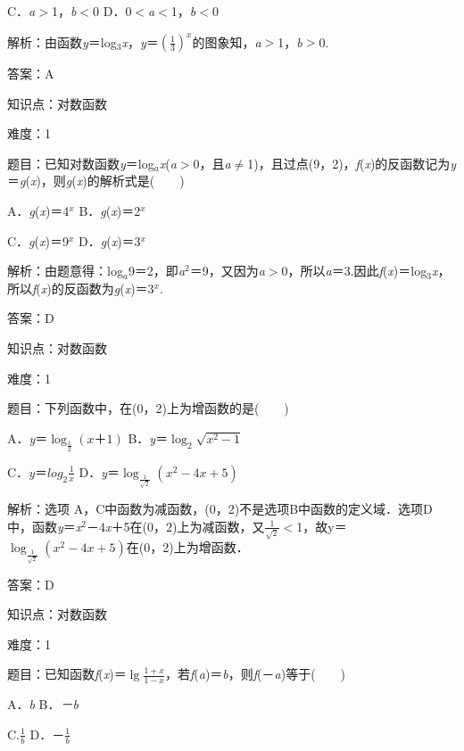 \documentclass{article} %
\begin{document}
C．\textit{a}$\mathrm{>}$1，\textit{b}$\mathrm{<}$0   D．0$\mathrm{<}$\textit{a}$\mathrm{<}$1，\textit{b}$\mathrm{<}$0

解析：由函数\textit{y}＝log${}_{3}$\textit{x}，\textit{y}＝$(\frac{1}{3})^{x}$的图象知，\textit{a}$\mathrm{>}$1，\textit{b}$\mathrm{>}$0.

答案：A

知识点：对数函数

难度：1

题目：已知对数函数\textit{y}＝log\textit{${}_{a}$x}(\textit{a}$\mathrm{>}$0，且\textit{a}$\mathrm{\neq}$1)，且过点(9，2)，\textit{f}(\textit{x})的反函数记为\textit{y}＝\textit{g}(\textit{x})，则\textit{g}(\textit{x})的解析式是(　　)

A．\textit{g}(\textit{x})＝4\textit{${}^{x}$}   B．\textit{g}(\textit{x})＝2\textit{${}^{x}$}

C．\textit{g}(\textit{x})＝9\textit{${}^{x}$}   D．\textit{g}(\textit{x})＝3\textit{${}^{x}$}

解析：由题意得：log\textit{${}_{a}$}9＝2，即\textit{a}${}^{2}$＝9，又因为\textit{a}$\mathrm{>}$0，所以\textit{a}＝3.因此\textit{f}(\textit{x})＝log${}_{3}$\textit{x}，所以\textit{f}(\textit{x})的反函数为\textit{g}(\textit{x})＝3\textit{${}^{x}$}.

答案：D


知识点：对数函数

难度：1

题目：下列函数中，在(0，2)上为增函数的是(　　)

A．\textit{y}＝$\log_\frac{1}{2} (\textit{x}＋1)$   B．\textit{y}＝$\log_2 \sqrt{x^{2}-1}$

C．\textit{y}＝$log_2 \frac{1}{x}$   D．\textit{y}＝$\log_\frac{1}{\sqrt{2}} (x^{2}-4x+5)$

解析：选项 A，C中函数为减函数，(0，2)不是选项B中函数的定义域．选项D中，函数\textit{y}＝\textit{x}${}^{2}$－4\textit{x}＋5在(0，2)上为减函数，又$\frac{1}{\sqrt{2}}$$\mathrm{<}$1，故y＝$\log_\frac{1}{\sqrt{2}} (x^{2}-4x+5)$在(0，2)上为增函数．

答案：D

知识点：对数函数

难度：1

题目：已知函数\textit{f}(\textit{x})＝$\lg\frac{1+x}{1-x}$，若\textit{f}(\textit{a})＝\textit{b}，则\textit{f}(－\textit{a})等于(　　)

A．\textit{b}   B．\textit{－b}

C.$\frac{1}{b}$   D．－$\frac{1}{b}$
\end{document}
